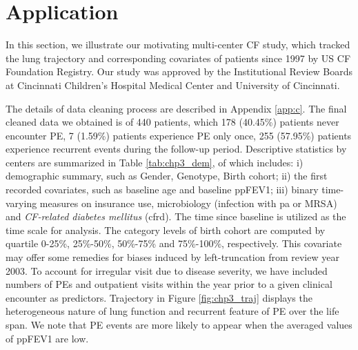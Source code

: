 \section{Application} \label{sec:chp3_app}

In this section, we illustrate our motivating multi-center CF study, which tracked the lung trajectory and corresponding covariates of patients since 1997 by US CF Foundation Registry. Our study was approved by the Institutional Review Boards at Cincinnati Children’s Hospital Medical Center and University of Cincinnati.

The details of data cleaning process are described in Appendix \ref{app:c}. The final cleaned data we obtained is of 440 patients, which 178 (40.45\%) patients never encounter PE, 7 (1.59\%) patients experience PE only once, 255 (57.95\%) patients experience recurrent events during the follow-up period. Descriptive statistics by centers are summarized in Table \ref{tab:chp3_dem}, of which includes: i) demographic summary, such as Gender, Genotype, Birth cohort; ii) the first recorded covariates, such as baseline age and baseline ppFEV1; iii) binary time-varying measures on insurance use, microbiology (infection with pa or MRSA) and \emph{CF-related diabetes mellitus} (cfrd). The time since baseline is utilized as the time scale for analysis. The category levels of birth cohort are computed by quartile 0-25\%, 25\%-50\%, 50\%-75\% and 75\%-100\%, respectively. This covariate may offer some remedies for biases induced by left-truncation from review year 2003. To account for irregular visit due to disease severity, we have included numbers of PEs and outpatient visits within the year prior to a given clinical encounter as predictors. Trajectory in Figure \ref{fig:chp3_traj} displays the heterogeneous nature of lung function and recurrent feature of PE over the life span. We note that PE events are more likely to appear when the averaged values of ppFEV1 are low.   

